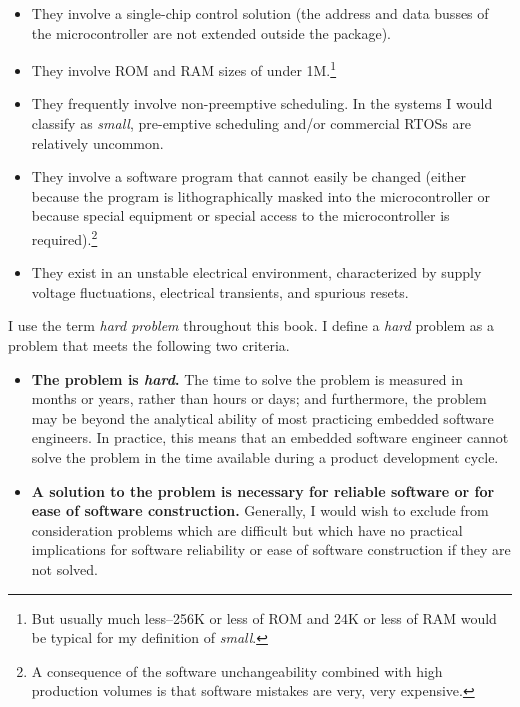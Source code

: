 \documentclass[letterpaper,10pt,titlepage]{custbook}
\begin{document}
\begin{itemize}
\item They
involve a single-chip control solution (the address and data busses of
the microcontroller are not extended outside the package).
\item They
involve ROM and RAM sizes of under 1M.\footnote{But usually much less--256K or less of ROM and 24K
or less of RAM would be typical for my definition of \emph{small}.}
\item They frequently involve non-preemptive scheduling.  In the systems I would
classify as \emph{small}, pre-emptive scheduling and/or commercial
RTOSs are relatively uncommon.
\item They involve a software
program that cannot easily be changed (either because the program
is lithographically masked into the microcontroller or because special
equipment or special access to the microcontroller is required).\footnote{A consequence of the
software unchangeability
combined with high production volumes is
that software mistakes are very, very expensive.}
\item They exist in an unstable electrical environment,
characterized by supply voltage fluctuations,
electrical transients, and spurious resets.
\end{itemize}

I use the term \emph{hard problem} throughout this book.
I define a
\emph{hard} problem as a problem that
meets the following two criteria.
\begin{itemize}
   \item \textbf{The problem is \emph{hard}.}
         The time to solve the problem is measured in
         months or years, rather than hours or days; and furthermore,
         the problem may be beyond the analytical ability of
         most practicing embedded software engineers.  In practice, this means that
         an embedded software engineer cannot solve the problem in the time
         available during a product development cycle.
   \item \textbf{A solution to the problem is necessary for
         reliable software or for ease of software construction.}
         Generally, I would wish to exclude from consideration
         problems which are difficult but which have no practical implications
         for software reliability or ease of software construction
         if they are not solved.
\end{itemize}
\end{document}
